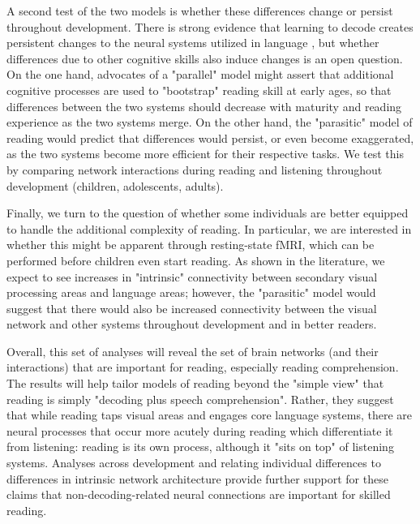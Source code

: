 A second test of the two models is whether these differences change or persist throughout development. There is strong evidence that learning to decode creates persistent changes to the neural systems utilized in language \citep{SeidenbergXXXX, DahaeneXXXX}, but whether differences due to other cognitive skills also induce changes is an open question. On the one hand, advocates of a "parallel" model might assert that additional cognitive processes are used to "bootstrap" reading skill at early ages, so that differences between the two systems should decrease with maturity and reading experience as the two systems merge. On the other hand, the "parasitic" model of reading would predict that differences would persist, or even become exaggerated, as the two systems become more efficient for their respective tasks. We test this by comparing network interactions during reading and listening throughout development (children, adolescents, adults).  

Finally, we turn to the question of whether some individuals are better equipped to handle the additional complexity of reading. In particular, we are interested in whether this  might be apparent through resting-state fMRI, which can be performed before children even start reading. As shown in the literature, we expect to see increases in "intrinsic" connectivity between secondary visual processing areas and language areas; however, the "parasitic" model would suggest that there would also be increased connectivity between the visual network and other systems throughout development and in better readers. 

Overall, this set of analyses will reveal the set of brain networks (and their interactions) that are important for reading, especially reading comprehension. The results will help tailor models of reading beyond the "simple view" that reading is simply "decoding plus speech comprehension". Rather, they suggest that while reading taps visual areas and engages core language systems, there are neural processes that occur more acutely during reading which differentiate it from listening: reading is its own process, although it "sits on top" of listening systems. Analyses across development and relating individual differences to differences in intrinsic network architecture provide further support for these claims that non-decoding-related neural connections are important for skilled reading. 
